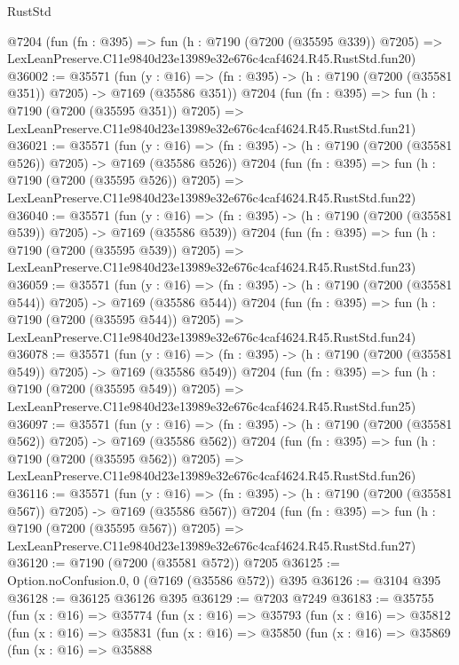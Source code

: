 \begin{lexlean}{RustStd}
\begin{coremodule}
    @7204
    (fun (fn : @395) =>
    fun (h : @7190 (@7200 (@35595 @339)) @7205) =>
    LexLeanPreserve.C11e9840d23e13989e32e676c4caf4624.R45.RustStd.fun20)
@36002 := @35571
    (fun (y : @16) => (fn : @395) -> (h : @7190 (@7200 (@35581 @351)) @7205) -> @7169 (@35586 @351))
    @7204
    (fun (fn : @395) =>
    fun (h : @7190 (@7200 (@35595 @351)) @7205) =>
    LexLeanPreserve.C11e9840d23e13989e32e676c4caf4624.R45.RustStd.fun21)
@36021 := @35571
    (fun (y : @16) => (fn : @395) -> (h : @7190 (@7200 (@35581 @526)) @7205) -> @7169 (@35586 @526))
    @7204
    (fun (fn : @395) =>
    fun (h : @7190 (@7200 (@35595 @526)) @7205) =>
    LexLeanPreserve.C11e9840d23e13989e32e676c4caf4624.R45.RustStd.fun22)
@36040 := @35571
    (fun (y : @16) => (fn : @395) -> (h : @7190 (@7200 (@35581 @539)) @7205) -> @7169 (@35586 @539))
    @7204
    (fun (fn : @395) =>
    fun (h : @7190 (@7200 (@35595 @539)) @7205) =>
    LexLeanPreserve.C11e9840d23e13989e32e676c4caf4624.R45.RustStd.fun23)
@36059 := @35571
    (fun (y : @16) => (fn : @395) -> (h : @7190 (@7200 (@35581 @544)) @7205) -> @7169 (@35586 @544))
    @7204
    (fun (fn : @395) =>
    fun (h : @7190 (@7200 (@35595 @544)) @7205) =>
    LexLeanPreserve.C11e9840d23e13989e32e676c4caf4624.R45.RustStd.fun24)
@36078 := @35571
    (fun (y : @16) => (fn : @395) -> (h : @7190 (@7200 (@35581 @549)) @7205) -> @7169 (@35586 @549))
    @7204
    (fun (fn : @395) =>
    fun (h : @7190 (@7200 (@35595 @549)) @7205) =>
    LexLeanPreserve.C11e9840d23e13989e32e676c4caf4624.R45.RustStd.fun25)
@36097 := @35571
    (fun (y : @16) => (fn : @395) -> (h : @7190 (@7200 (@35581 @562)) @7205) -> @7169 (@35586 @562))
    @7204
    (fun (fn : @395) =>
    fun (h : @7190 (@7200 (@35595 @562)) @7205) =>
    LexLeanPreserve.C11e9840d23e13989e32e676c4caf4624.R45.RustStd.fun26)
@36116 := @35571
    (fun (y : @16) => (fn : @395) -> (h : @7190 (@7200 (@35581 @567)) @7205) -> @7169 (@35586 @567))
    @7204
    (fun (fn : @395) =>
    fun (h : @7190 (@7200 (@35595 @567)) @7205) =>
    LexLeanPreserve.C11e9840d23e13989e32e676c4caf4624.R45.RustStd.fun27)
@36120 := @7190 (@7200 (@35581 @572)) @7205
@36125 := Option.noConfusion.{0, 0} (@7169 (@35586 @572)) @395
@36126 := @3104 @395
@36128 := @36125 @36126 @395
@36129 := @7203 @7249
@36183 := @35755
    (fun (x : @16) =>
    @35774
      (fun (x : @16) =>
      @35793
        (fun (x : @16) =>
        @35812
          (fun (x : @16) =>
          @35831
            (fun (x : @16) =>
            @35850
              (fun (x : @16) =>
              @35869
                (fun (x : @16) =>
                @35888

\end{coremodule}
\end{lexlean}
